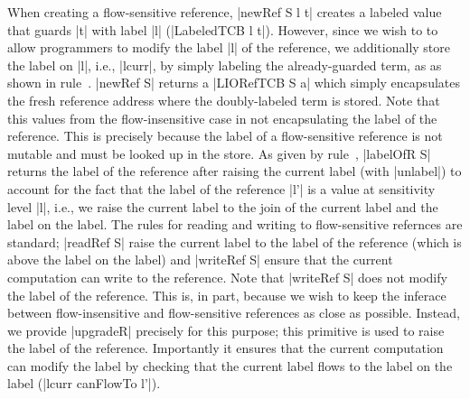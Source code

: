 When creating a flow-sensitive reference, |newRef S l t| creates a labeled
value that guards |t| with label |l| (|LabeledTCB l t|).
%
However, since we wish to to allow programmers to modify the label |l| of the
reference, we additionally store the label on |l|, i.e., |lcurr|, by simply
labeling the already-guarded term, as as shown in rule~.
%
|newRef S| returns a |LIORefTCB S a| which simply encapsulates the fresh
reference address where the doubly-labeled term is stored.
%
Note that this values from the flow-insensitive case in not encapsulating the
label of the reference.
%
This is precisely because the label of a flow-sensitive reference is not
mutable and must be looked up in the store.
%
As given by rule~, |labelOfR S| returns the label of the
reference after raising the current label (with |unlabel|) to account for the
fact that the label of the reference |l'| is a value at sensitivity level |l|,
i.e., we raise the current label to the join of the current label and the label
on the label.
%
The rules for reading and writing to flow-sensitive refernces are standard;
|readRef S| raise the current label to the label of the reference (which is
above the label on the label) and |writeRef S| ensure that the current
computation can write to the reference.
%
Note that |writeRef S| does not modify the label of the reference.
%
This is, in part, because we wish to keep the inferace between flow-insensitive
and flow-sensitive references as close as possible.
%
Instead, we provide |upgradeR| precisely for this purpose; this primitive is
used to raise the label of the reference.
%
Importantly it ensures that the current computation can modify the label by
checking that the current label flows to the label on the label (|lcurr
canFlowTo l'|).




